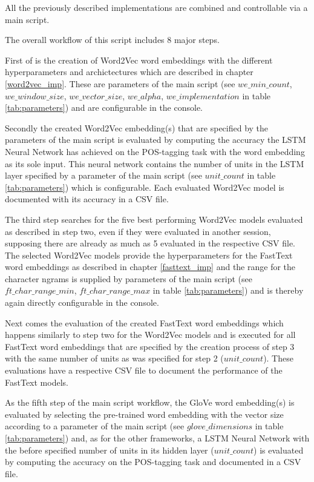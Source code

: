 All the previously described implementations are combined and controllable via a main script.

The overall workflow of this script includes 8 major steps. 


First of is the creation of Word2Vec word embeddings with the different hyperparameters and archictectures which are described in chapter \ref{word2vec_imp}. These are parameters of the main script (see $we\_min\_count$, $we\_window\_size$, $we\_vector\_size$, $we\_alpha$, $we\_implementation$ in table \ref{tab:parameters}) and are configurable in the console.

Secondly the created Word2Vec embedding(s) that are specified by the parameters of the main script is evaluated by computing the accuracy the LSTM Neural Network has achieved on the POS-tagging task with the word embedding as its sole input. This neural network contains the number of units in the LSTM layer specified by a parameter of the main script (see $unit\_count$ in table \ref{tab:parameters}) which is configurable. Each evaluated Word2Vec model is documented with its accuracy in a CSV file.

The third step searches for the five best performing Word2Vec models evaluated as described in step two, even if they were evaluated in another session, supposing there are already as much as 5 evaluated in the respective CSV file. The selected Word2Vec models provide the hyperparameters for the FastText word embeddings as described in chapter \ref{fasttext_imp} and the range for the character ngrams is supplied by parameters of the main script (see $ft\_char\_range\_min$, $ft\_char\_range\_max$ in table \ref{tab:parameters}) and is thereby again directly configurable in the console.

Next comes the evaluation of the created FastText word embeddings which happens similarly to step two for the Word2Vec models and is executed for all FastText word embeddings that are specified by the creation process of step 3 with the same number of units as was specified for step 2 ($unit\_count$). These evaluations have a respective CSV file to document the performance of the FastText models.

As the fifth step of the main script workflow, the GloVe word embedding(s) is evaluated by selecting the pre-trained word embedding with the vector size according to a parameter of the main script (see $glove\_dimensions$ in table \ref{tab:parameters}) and, as for the other frameworks, a LSTM Neural Network with the before specified number of units in its hidden layer ($unit\_count$) is evaluated by computing the accuracy on the POS-tagging task and documented in a CSV file.


